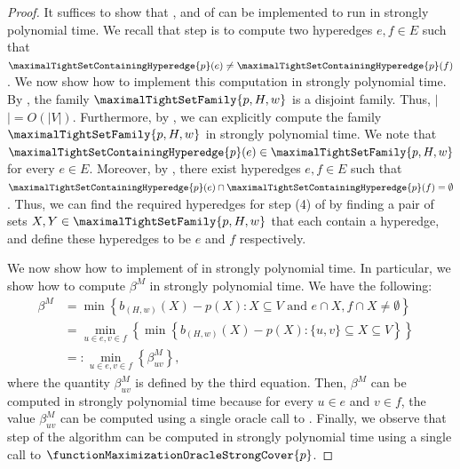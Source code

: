   \begin{proof}
  It suffices to show that  ,  and  of  can be implemented to run in strongly polynomial time.
  We recall that step  is to compute two hyperedges $e, f \in E$ such that $\maximalTightSetContainingHyperedge{p}(e) \not = \maximalTightSetContainingHyperedge{p}(f)$. We now show how to implement this computation in strongly polynomial time.  By , the family $\maximalTightSetFamily{p, H, w}$ is a disjoint family. Thus, $|$$| = O(|V|)$. Furthermore,  by , we can explicitly compute the family $\maximalTightSetFamily{p, H, w}$ in strongly polynomial time. We note that $\maximalTightSetContainingHyperedge{p}(e) \in \maximalTightSetFamily{p, H, w}$ for every $e \in E$.
      Moreover, by , there exist hyperedges $e, f \in E$ such that $\maximalTightSetContainingHyperedge{p}(e) \cap \maximalTightSetContainingHyperedge{p}(f) = \emptyset$. Thus, we can find the required hyperedges for step (4) of  by finding a pair of sets $X, Y \in \maximalTightSetFamily{p, H, w}$ that each contain a hyperedge, and define these hyperedges to be $e$ and $f$ respectively.

      We now show how to implement  of  in strongly polynomial time. In particular, we show how to compute $\beta^M$ in strongly polynomial time.
We have the following:
\begin{align*}
    \beta^M& = \min\left\{b_{(H,w)}(X) - p(X) : X \subseteq V \text{ and } e \cap X, f \cap X \not = \emptyset\right\} &\\
    & = \min_{u \in e, v \in f}\left\{\min\left\{b_{(H,w)}(X) - p(X) : \{u,v\} \subseteq X \subseteq V\right\}\right\}&\\
    &=: \min_{u \in e, v \in f}\left\{\beta^M_{uv}\right\},&
\end{align*}
where the quantity $\beta^M_{uv}$ is defined by the third equation. Then, $\beta^M$ can be computed in strongly polynomial time because  for every $u \in e$ and $v \in f$, the value $\beta^M_{uv}$ can be computed using a single oracle call to . Finally, we observe that step  of the algorithm can be computed in strongly polynomial time using a single call to $\functionMaximizationOracleStrongCover{p}$.
  \end{proof}

